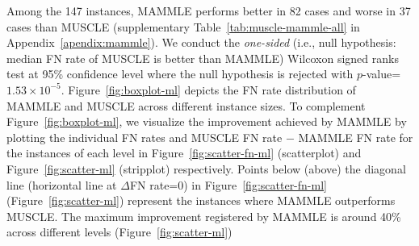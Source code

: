 Among the 147 instances, MAMMLE performs better in 82 cases and worse in 37 cases than MUSCLE (supplementary Table~\ref{tab:muscle-mammle-all} in Appendix~\ref{apendix:mammle}). We conduct the \textit{one-sided} (i.e., null hypothesis: median FN rate of MUSCLE is better than MAMMLE) Wilcoxon signed ranks test at 95\% confidence level where the null hypothesis is rejected with $p$-value=$1.53\times10^{-5}$. 
Figure~\ref{fig:boxplot-ml} depicts the FN rate distribution of MAMMLE and MUSCLE across different instance sizes. 
To complement Figure~\ref{fig:boxplot-ml}, we visualize the improvement achieved by MAMMLE by plotting the individual FN rates and MUSCLE FN rate $-$ MAMMLE FN rate for the instances of each level in Figure~\ref{fig:scatter-fn-ml} (scatterplot) and Figure~\ref{fig:scatter-ml} (stripplot) respectively. Points below (above) the diagonal line (horizontal line at $\Delta$FN rate=0) in Figure~\ref{fig:scatter-fn-ml} (Figure~\ref{fig:scatter-ml}) represent the instances where MAMMLE outperforms MUSCLE. The maximum improvement registered by MAMMLE is around 40\% across different levels (Figure~\ref{fig:scatter-ml})


